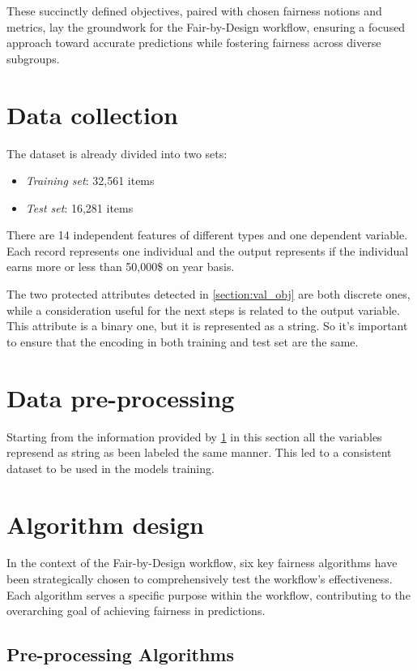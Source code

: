 These succinctly defined objectives, paired with chosen fairness notions and metrics, lay the groundwork for the Fair-by-Design workflow, ensuring a focused approach toward accurate predictions while fostering fairness across diverse subgroups.

\section{Data collection}
\label{section:val_dc}

The dataset is already divided into two sets:
\begin{itemize}
    \item \emph{Training set}: 32,561 items
    \item \emph{Test set}: 16,281 items
\end{itemize}

There are 14 independent features of different types and one dependent variable. Each record represents one individual and the output represents if the individual earns more or less than 50,000\$ on year basis.

The two protected attributes detected in \cref{section:val_obj} are both discrete ones, while a consideration useful for the next steps is related to the output variable. This attribute is a binary one, but it is represented as a string. So it's important to ensure that the encoding in both training and test set are the same.

\section{Data pre-processing}

Starting from the information provided by \cref{section:val_dc} in this section all the variables represend as string as been labeled the same manner. This led to a consistent dataset to be used in the models training.

\section{Algorithm design}
\label{section:val_alg}

In the context of the Fair-by-Design workflow, six key fairness algorithms have been strategically chosen to comprehensively test the workflow's effectiveness. Each algorithm serves a specific purpose within the workflow, contributing to the overarching goal of achieving fairness in predictions.

\subsection{Pre-processing Algorithms}

